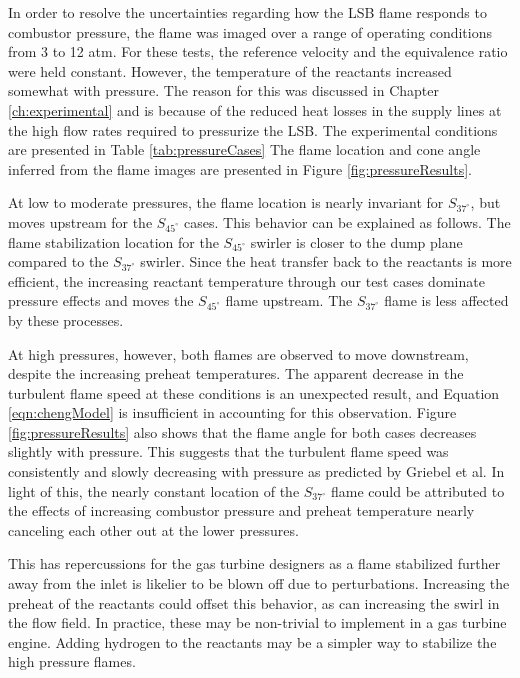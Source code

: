 In order to resolve the uncertainties regarding how the LSB flame responds to combustor pressure, the flame was imaged over a range of operating conditions from 3 to 12 atm.
For these tests, the reference velocity and the equivalence ratio were held constant.
However, the temperature of the reactants increased somewhat with pressure.
The reason for this was discussed in Chapter \ref{ch:experimental} and is because of the reduced heat losses in the supply lines at the high flow rates required to pressurize the LSB.
The experimental conditions are presented in Table \ref{tab:pressureCases}
The flame location and cone angle inferred from the flame images are presented in Figure \ref{fig:pressureResults}.




At low to moderate pressures, the flame location is nearly invariant for \(S_{37^\circ}\), but moves upstream for the \(S_{45^\circ}\) cases.
This behavior can be explained as follows.
The flame stabilization location for the \(S_{45^\circ}\) swirler is closer to the dump plane compared to the \(S_{37^\circ}\) swirler.
Since the heat transfer back to the reactants is more efficient, the increasing reactant temperature through our test cases dominate pressure effects and moves the \(S_{45^\circ}\) flame upstream.
The \(S_{37^\circ}\) flame is less affected by these processes.

At high pressures, however, both flames are observed to move downstream, despite the increasing preheat temperatures.
The apparent decrease in the turbulent flame speed at these conditions is an unexpected result, and Equation \ref{eqn:chengModel} is insufficient in accounting for this observation.
Figure \ref{fig:pressureResults} also shows that the flame angle for both cases decreases slightly with pressure.
This suggests that the turbulent flame speed was consistently and slowly decreasing with pressure as predicted by Griebel et al.
In light of this, the nearly constant location of the \(S_{37^\circ}\) flame could be attributed to the effects of increasing combustor pressure and preheat temperature nearly canceling each other out at the lower pressures.

This has repercussions for the gas turbine designers as a flame stabilized further away from the inlet is likelier to be blown off due to perturbations.
Increasing the preheat of the reactants could offset this behavior, as can increasing the swirl in the flow field.
In practice, these may be non-trivial to implement in a gas turbine engine.
Adding hydrogen to the reactants may be a simpler way to stabilize the high pressure flames.

